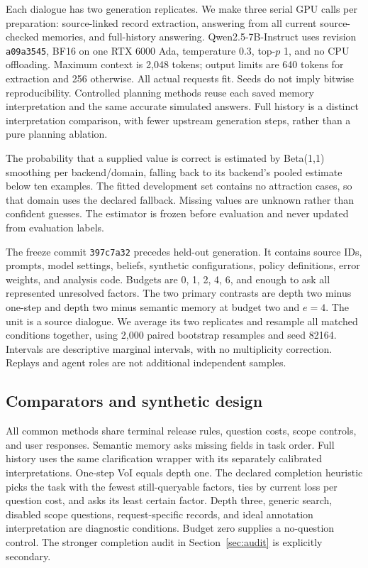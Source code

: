 \documentclass[11pt]{article}
\begin{document}
Each dialogue has two generation replicates. We make three serial GPU calls per preparation: source-linked record extraction, answering from all current source-checked memories, and full-history answering. Qwen2.5-7B-Instruct uses revision \texttt{a09a3545}, BF16 on one RTX 6000 Ada, temperature 0.3, top-$p$ 1, and no CPU offloading. Maximum context is 2,048 tokens; output limits are 640 tokens for extraction and 256 otherwise. All actual requests fit. Seeds do not imply bitwise reproducibility. Controlled planning methods reuse each saved memory interpretation and the same accurate simulated answers. Full history is a distinct interpretation comparison, with fewer upstream generation steps, rather than a pure planning ablation.

The probability that a supplied value is correct is estimated by Beta(1,1) smoothing per backend/domain, falling back to its backend's pooled estimate below ten examples. The fitted development set contains no attraction cases, so that domain uses the declared fallback. Missing values are unknown rather than confident guesses. The estimator is frozen before evaluation and never updated from evaluation labels.

The freeze commit \texttt{397c7a32} precedes held-out generation. It contains source IDs, prompts, model settings, beliefs, synthetic configurations, policy definitions, error weights, and analysis code. Budgets are 0, 1, 2, 4, 6, and enough to ask all represented unresolved factors. The two primary contrasts are depth two minus one-step and depth two minus semantic memory at budget two and $e=4$. The unit is a source dialogue. We average its two replicates and resample all matched conditions together, using 2,000 paired bootstrap resamples and seed 82164. Intervals are descriptive marginal intervals, with no multiplicity correction. Replays and agent roles are not additional independent samples.

\subsection{Comparators and synthetic design}
All common methods share terminal release rules, question costs, scope controls, and user responses. Semantic memory asks missing fields in task order. Full history uses the same clarification wrapper with its separately calibrated interpretations. One-step VoI equals depth one. The declared completion heuristic picks the task with the fewest still-queryable factors, ties by current loss per question cost, and asks its least certain factor. Depth three, generic search, disabled scope questions, request-specific records, and ideal annotation interpretation are diagnostic conditions. Budget zero supplies a no-question control. The stronger completion audit in Section~\ref{sec:audit} is explicitly secondary.
\end{document}
